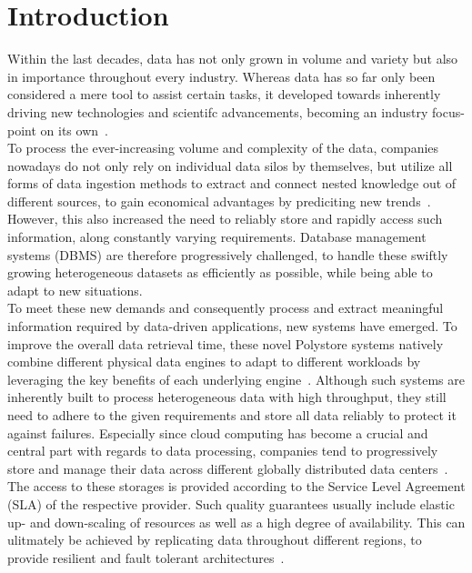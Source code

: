 \chapter{Introduction}
\label{c:intro}

Within the last decades, data has not only grown in volume and variety but also in importance throughout every industry. 
Whereas data has so far only been considered a mere tool to assist certain tasks, it developed towards inherently
driving new technologies and scientifc advancements, becoming an industry focus-point on its own~\cite{data-driven_2014}.\\
To process the ever-increasing volume and complexity of the data, companies nowadays do not only rely on individual data silos by themselves, but utilize 
all forms of data ingestion methods to extract and connect nested knowledge out of different sources,
to gain economical advantages by prediciting new trends~\cite{ingestion_2016}.
However, this also increased the need to reliably store and rapidly access such information, along constantly varying requirements.
Database management systems (DBMS) are therefore progressively challenged, to handle these swiftly growing heterogeneous datasets as efficiently as possible,
while being able to adapt to new situations.\\
To meet these new demands and consequently process and extract meaningful information required by data-driven applications, new systems have emerged.
To improve the overall data retrieval time, these novel Polystore systems natively combine different physical data engines to 
adapt to different workloads by leveraging the key benefits of each underlying engine~\cite{stonebraker:2005, polypheny2020}. 
Although such systems are inherently built to process heterogeneous data with high throughput, they still need to adhere to the given requirements
and store all data reliably to protect it against failures.  
Especially since cloud computing has become a crucial and central part with regards to data processing, 
companies tend to progressively store and manage their data across different globally distributed data centers~\cite{claremont:2005}. 
The access to these storages is provided according to the Service Level Agreement (SLA) of the respective provider.
Such quality guarantees usually include elastic up- and down-scaling of resources as well as a high degree of availability.
This can ulitmately be achieved by replicating data throughout different regions, to provide resilient and fault tolerant architectures~\cite{brinkmann:2015, terry:2013}.\\
